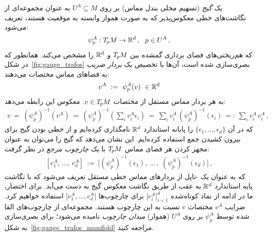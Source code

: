 یک \emph{گیج} (تسهیم محلی بندل مماس) بر روی $U^A\subseteq M$ به عنوان مجموعه‌ای از نگاشت‌های خطی معکوس‌پذیر که به صورت هموار وابسته به موقعیت هستند، تعریف می‌شود:
\begin{align}\label{eq:gauge_definition}
	\psi_p^A:T_{\mkern-1.5mu p}\mkern-.5muM\to\mathbb{R}^d \,,\ \ p\in U^A \,,
\end{align}
که هم‌ریختی‌های فضای برداری گمشده بین $T_{\mkern-1.5mu p}\mkern-.5muM$ و $\mathbb{R}^d$ را مشخص می‌کند. همانطور که در شکل~\ref{fig:gauge_trafos} بصری‌سازی شده است، آن‌ها با تخصیص یک \emph{بردار ضریب} به فضاهای مماس مختصات می‌دهند:
\begin{align}
	v^A\ :=\ \psi_p^A(v) \ \in\mathbb{R}^d
\end{align}
به هر بردار مماس مستقل از مختصات $v\in T_{\mkern-1.5mu p}\mkern-.5muM$. معکوس این رابطه می‌دهد:
\begin{align}
	v\ =\ \left(\psi_p^A\right)^{-1}\! (v^A)
	\ =\ \left(\psi_p^A\right)^{-1}\!\! \left(\sum\nolimits_i v_i^A \epsilon_i\right)
	\ =\ \sum\nolimits_i v_i^A\, \left(\psi_p^A\right)^{-1}\!(\epsilon_i)
	\ =:\ \sum\nolimits_i v_i^A\, e_i^A \,,
\end{align}
که در آن $\{\epsilon_1,\dots,\epsilon_d\}$ را پایانه استاندارد $\mathbb{R}^d$ نامگذاری کرده‌ایم و از خطی بودن گیج برای بیرون کشیدن جمع استفاده کرده‌ایم. این نشان می‌دهد که گیج را می‌توان به عنوان مجهز کردن هر فضای مماس $T_{\mkern-1.5mu p}\mkern-.5muM$ با یک \emph{چارچوب مرجع} در نظر گرفت:
\begin{align}\label{eq:framefield_gauge_equivalence}
	\left[e^A_{1}, \,\dots,\, e^A_{d}\right]
	\ :=\ \Big[(\psi_p^A)^{-1}(\epsilon_1), \:\dots\,,\; (\psi_p^A)^{-1}(\epsilon_d)\Big] \,,
\end{align}
که به عنوان یک -تاپل از بردارهای مماس خطی مستقل تعریف می‌شود که با نگاشت پایه استاندارد $\mathbb{R}^d$ به عقب از طریق نگاشت معکوس گیج به دست می‌آید. برای اختصار، ما در ادامه از نماد کوتاه‌شده $\big[e_i^A \big]_{i=1}^d$ برای چارچوب‌ها $\big[e_1^A, \dots, e_d^A \big]$ استفاده خواهیم کرد. ضرایب $v^A$ مختصات $v$ نسبت به این چارچوب هستند. مجموعه‌ای از چارچوب‌های القا شده توسط $\psi_p^A$ بر روی $U^A$ (هموار) \emph{میدان چارچوب} نامیده می‌شود؛ برای بصری‌سازی به شکل~\ref{fig:gauge_trafos_manifold} مراجعه کنید.


